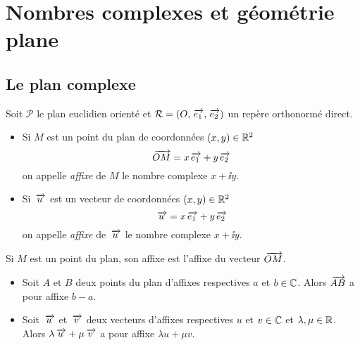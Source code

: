 \documentclass{magnolia}
\begin{document}
\section{Nombres complexes et géométrie plane}

\subsection{Le plan complexe}
\begin{definition}
Soit $\mathcal{P}$ le plan euclidien orienté et $\mathcal{R}=\left(O,\kern 2pt\overrightarrow{\kern -2pte_1},\kern 2pt\overrightarrow{\kern -2pte_2}\right)$ un repère orthonormé direct.
\begin{itemize}
\item Si $M$ est un point du plan de coordonnées $(x,y)\in\mathbb{R}^2$
  \[\kern 2pt\overrightarrow{\kern -2ptOM}=x \kern 2pt\overrightarrow{\kern -2pte_1}+y \kern 2pt\overrightarrow{\kern -2pte_2}\]
  on appelle \emph{affixe} de $M$ le nombre complexe $x+\ii y$.
\item Si $\kern 2pt\overrightarrow{\kern -2ptu}$ est un vecteur de coordonnées $(x,y)\in\mathbb{R}^2$
  \[\kern 2pt\overrightarrow{\kern -2ptu}=x \kern 2pt\overrightarrow{\kern -2pte_1}+y \kern 2pt\overrightarrow{\kern -2pte_2}\]
  on appelle \emph{affixe} de $\kern 2pt\overrightarrow{\kern -2ptu}$ le nombre complexe $x+\ii y$.
\end{itemize}
\end{definition}

\begin{remarqueUnique}
\remarque Si $M$ est un point du plan, son affixe est l'affixe du vecteur $\kern 2pt\overrightarrow{\kern -2ptOM}$.
\end{remarqueUnique}

\begin{proposition}
\begin{itemize}
\item Soit $A$ et $B$ deux points du plan d'affixes respectives $a$ et $b\in\mathbb{C}$. Alors $\kern 2pt\overrightarrow{\kern -2ptAB}$ a pour affixe $b-a$.
\item Soit $\kern 2pt\overrightarrow{\kern -2ptu}$ et $\kern 2pt\overrightarrow{\kern -2ptv}$ deux vecteurs d'affixes respectives $u$ et $v\in\mathbb{C}$ et $\lambda,\mu\in\mathbb{R}$. Alors $\lambda\kern 2pt\overrightarrow{\kern -2ptu}+\mu\kern 2pt\overrightarrow{\kern -2ptv}$ a pour affixe $\lambda u+\mu v$.
\end{itemize}
\end{proposition}

\end{document}
